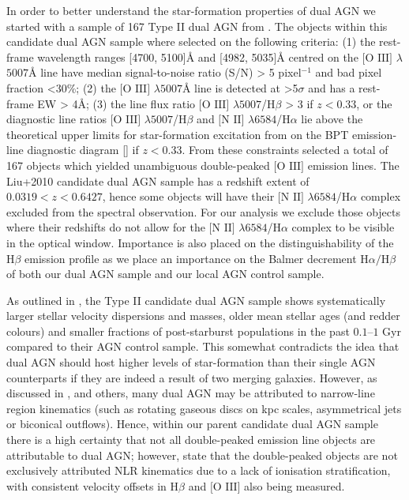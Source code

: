 In order to better understand the star-formation properties of dual AGN we started with a sample of 167 Type II dual AGN from \cite{Liu_2009}. The objects within this candidate dual AGN sample where selected on the following criteria: (1) the rest-frame wavelength ranges [4700, 5100]\AA{} and [4982, 5035]\AA{} centred on the $\text{[O III]}$ $\lambda$$5007$\AA{} line have median signal-to-noise ratio (S/N) > 5 pixel$^{−1}$ and bad pixel fraction <30\%; (2) the $\text{[O III]}$ $\lambda$$5007$\AA{} line is detected at >5$\sigma$ and has a rest-frame EW > 4\AA; (3) the line flux ratio $\text{[O III]}$ $\lambda$$5007$/$\text{H}\beta$ > 3 if ${z}<{0.33}$, or the diagnostic line ratios $\text{[O III]}$ $\lambda$$5007$/$\text{H}\beta$ and $\text{[N II]}$ $\lambda$$6584$/$\text{H}\alpha$ lie above the theoretical upper limits for star-formation excitation from \cite{Kewley_Dopita_Sutherland_Heisler_Trevena_2001} on the BPT emission-line diagnostic diagram [\cite{Baldwin_1981}] if ${z}<{0.33}$. From these constraints \cite{Liu_2009} selected a total of 167 objects which yielded unambiguous double-peaked $\text{[O III]}$ emission lines. The Liu+2010 candidate dual AGN sample has a redshift extent of ${0.0319}<{z}<{0.6427}$, hence some objects will have their $\text{[N II]}$ $\lambda$$6584$/$\text{H}\alpha$ complex excluded from the spectral observation. For our analysis we exclude those objects where their redshifts do not allow for the $\text{[N II]}$ $\lambda$$6584$/$\text{H}\alpha$ complex to be visible in the optical window. Importance is also placed on the distinguishability of the $\text{H}\beta$ emission profile as we place an importance on the Balmer decrement $\text{H}\alpha/\text{H}\beta$ of both our dual AGN sample and our local AGN control sample.

As outlined in \cite{Liu_2009}, the Type II candidate dual AGN sample shows systematically larger stellar velocity dispersions and masses, older mean stellar ages (and redder colours) and smaller fractions of post-starburst populations in the past $0.1–1$ Gyr compared to their AGN control sample. This somewhat contradicts the idea that dual AGN should host higher levels of star-formation than their single AGN counterparts if they are indeed a result of two merging galaxies. However, as discussed in \cite{Liu_2009}, and others, many dual AGN may be attributed to narrow-line region kinematics (such as rotating gaseous discs on kpc scales, asymmetrical jets or biconical outflows). Hence, within our parent candidate dual AGN sample there is a high certainty that not all double-peaked emission line objects are attributable to dual AGN; however, \cite{Liu_2009} state that the double-peaked objects are not exclusively attributed NLR kinematics due to a lack of ionisation stratification, with consistent velocity offsets in $\text{H}\beta$ and $\text{[O III]}$ also being measured.

